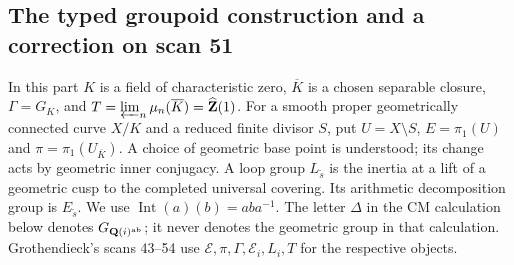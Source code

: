 \documentclass[11pt,oneside]{article}
\begin{document}
\subsection{The typed groupoid construction and a correction on scan 51}

In this part $K$ is a field of characteristic zero, $\overline K$ is a
chosen separable closure, $\Gamma=G_K$, and
$T=\varprojlim_n\mu_n(\overline K)=\widehat{\mathbf Z}(1)$.
For a smooth proper geometrically connected curve $X/K$ and a reduced
finite divisor $S$, put $U=X\setminus S$, $E=\pi_1(U)$ and
$\pi=\pi_1(U_{\overline K})$.  A choice of geometric base point is
understood; its change acts by geometric inner conjugacy.  A loop group
$L_{\widetilde s}$ is the inertia at a lift of a geometric cusp to the
completed universal covering.  Its arithmetic decomposition group is
$E_{\widetilde s}$.  We use $\operatorname{Int}(a)(b)=aba^{-1}$.
The letter $\Delta$ in the CM calculation below denotes
$G_{\mathbf Q(i)^{\rm ab}}$; it never denotes the geometric group in
that calculation.  Grothendieck's scans 43--54 use $\mathcal E,\pi,
\Gamma,\mathcal E_i,L_i,T$ for the respective objects.
\end{document}
